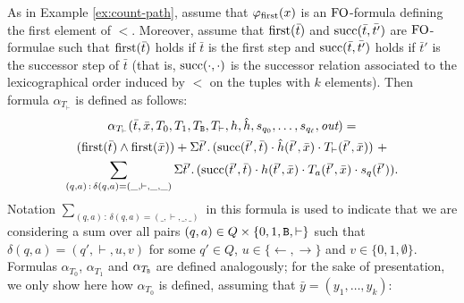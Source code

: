 As in Example \ref{ex:count-path}, assume that $\varphi_{\text{\rm first}}(x)$ is an ${\rm FO}$-formula defining the first element of $<$. Moreover, assume that $\operatorname{first}(\bar t)$ and $\operatorname{succ}(\bar{t},\bar{t'})$ are ${\rm FO}$-formulae such that 
$\operatorname{first}(\bar t)$ holds if $\bar t$ is the first step and $\operatorname{succ}(\bar{t},\bar{t'})$ holds if $\bar t'$ is the successor step of $\bar t$ (that is, $\operatorname{succ}(\cdot,\cdot)$ is the successor relation associated to the lexicographical order induced by $<$ on the tuples with $k$ elements).  Then formula $\alpha_{T_{\vdash}}$ is defined as follows:
\begin{multline*}
\alpha_{T_{\vdash}}(\bar{t},\bar{x},T_0,T_1,T_{\mathtt{B}},T_{\vdash},h,\hat{h},s_{q_0},\ldots,s_{q_{\ell}},\text{\it out}) = \\
(\operatorname{first}(\bar{t}) \wedge \operatorname{first}(\bar{x})) +
\Sigma{\bar{t}'}.\,(\text{succ}(\bar{t}',\bar{t}) \cdot \hat{h}(\bar{t}',\bar{x}) \cdot T_{\vdash}(\bar{t}',\bar{x})) \ + \\
\sum_{(q,a) \,:\, \delta(q,a) = (\_,\vdash,\_,\_)}\Sigma{\bar{t}'}.\,(\text{succ}(\bar{t}',\bar{t}) \cdot h(\bar{t}',\bar{x}) \cdot T_a(\bar{t}',\bar{x}) \cdot s_{q}(\bar{t}')).
\end{multline*}
Notation $\sum_{(q,a) \,:\, \delta(q,a) = (\_,\vdash,\_,\_)}$ in this formula is used to indicate that we are considering a sum over all pairs $(q,a) \in Q \times \{0,1,\mathtt{B},\vdash\}$ such that $\delta(q,a) = (q',\vdash,u,v)$ for some $q' \in Q$, $u \in \{\leftarrow,\rightarrow\}$ and $v \in \{0,1,\emptyset\}$.
Formulas $\alpha_{T_0}$, $\alpha_{T_1}$ and $\alpha_{T_{\mathtt{B}}}$ are defined analogously; for the sake of presentation, we only show here how $\alpha_{T_0}$ is defined, assuming that $\bar y = (y_1, \ldots, y_k)$:
